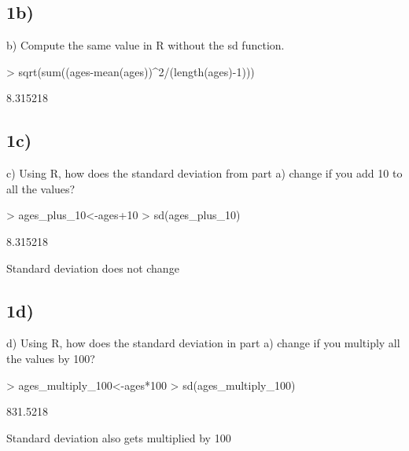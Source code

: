 \documentclass{article}
\begin{document}
\subsection*{1b)}
b) Compute the same value in R without the sd function.
\begin{Schunk}
\begin{Sinput}
> sqrt(sum((ages-mean(ages))^2/(length(ages)-1)))
\end{Sinput}
\begin{Soutput}
[1] 8.315218
\end{Soutput}
\end{Schunk}
\subsection*{1c)}
c) Using R, how does the standard deviation from part a) change if you add
10 to all the values?
\begin{Schunk}
\begin{Sinput}
> ages_plus_10<-ages+10
> sd(ages_plus_10)
\end{Sinput}
\begin{Soutput}
[1] 8.315218
\end{Soutput}
\end{Schunk}
Standard deviation does not change
\subsection*{1d)}
d) Using R, how does the standard deviation in part a) change if you
multiply all the values by 100?
\begin{Schunk}
\begin{Sinput}
> ages_multiply_100<-ages*100
> sd(ages_multiply_100)
\end{Sinput}
\begin{Soutput}
[1] 831.5218
\end{Soutput}
\end{Schunk}
Standard deviation also gets multiplied by 100
\end{document}
